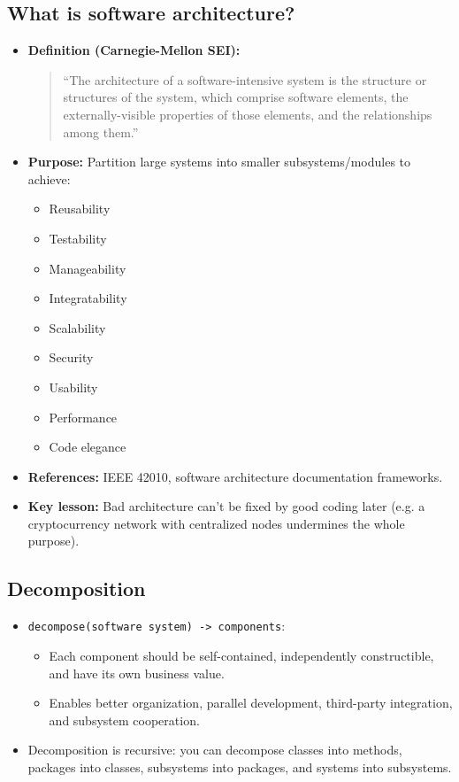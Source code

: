 \documentclass[11pt,a4paper]{article}
\begin{document}
\subsection*{What is software architecture?}
\begin{itemize}
    \item \textbf{Definition (Carnegie-Mellon SEI):} 
    \begin{quote}
        ``The architecture of a software-intensive system is the structure or structures of the system, which comprise software elements, the externally-visible properties of those elements, and the relationships among them.''
    \end{quote}
    \item \textbf{Purpose:} Partition large systems into smaller subsystems/modules to achieve:
        \begin{itemize}
            \item Reusability
            \item Testability
            \item Manageability
            \item Integratability
            \item Scalability
            \item Security
            \item Usability
            \item Performance
            \item Code elegance
        \end{itemize}
    \item \textbf{References:} IEEE 42010, software architecture documentation frameworks.
    \item \textbf{Key lesson:} Bad architecture can't be fixed by good coding later (e.g. a cryptocurrency network with centralized nodes undermines the whole purpose).
\end{itemize}

\subsection*{Decomposition}
\begin{itemize}
    \item \texttt{decompose(software system) -> components}:
        \begin{itemize}
            \item Each component should be self-contained, independently constructible, and have its own business value.
            \item Enables better organization, parallel development, third-party integration, and subsystem cooperation.
        \end{itemize}
    \item Decomposition is recursive: you can decompose classes into methods, packages into classes, subsystems into packages, and systems into subsystems.
\end{itemize}
\end{document}
